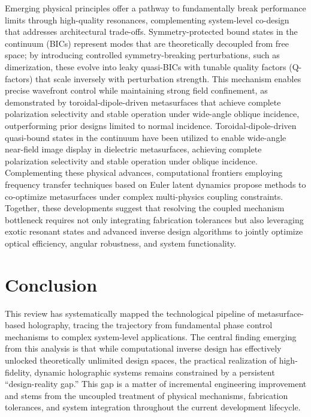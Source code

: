 Emerging physical principles offer a pathway to fundamentally break performance limits through high-quality resonances, complementing system-level co-design that addresses architectural trade-offs. Symmetry-protected bound states in the continuum (BICs) represent modes that are theoretically decoupled from free space; by introducing controlled symmetry-breaking perturbations, such as dimerization, these evolve into leaky quasi-BICs with tunable quality factors (Q-factors) that scale inversely with perturbation strength. This mechanism enables precise wavefront control while maintaining strong field confinement, as demonstrated by toroidal-dipole-driven metasurfaces that achieve complete polarization selectivity and stable operation under wide-angle oblique incidence, outperforming prior designs limited to normal incidence. Toroidal-dipole-driven quasi-bound states in the continuum have been utilized to enable wide-angle near-field image display in dielectric metasurfaces, achieving complete polarization selectivity and stable operation under oblique incidence. \citep{s2_5a46bf1115a13c8e88d03d52a56e80871e3550cd_094f009d} Complementing these physical advances, computational frontiers employing frequency transfer techniques based on Euler latent dynamics propose methods to co-optimize metasurfaces under complex multi-physics coupling constraints. Together, these developments suggest that resolving the coupled mechanism bottleneck requires not only integrating fabrication tolerances but also leveraging exotic resonant states and advanced inverse design algorithms to jointly optimize optical efficiency, angular robustness, and system functionality. \citep{doi_10_1103_physrevapplied_21_044004_d1b93ffe} \citep{s2_5a46bf1115a13c8e88d03d52a56e80871e3550cd_094f009d} \citep{doi_10_1038_s41467_025_57516_z_7c69e056}

\section{Conclusion}\label{conclusion}

This review has systematically mapped the technological pipeline of metasurface-based holography, tracing the trajectory from fundamental phase control mechanisms to complex system-level applications. The central finding emerging from this analysis is that while computational inverse design has effectively unlocked theoretically unlimited design spaces, the practical realization of high-fidelity, dynamic holographic systems remains constrained by a persistent ``design-reality gap.'' This gap is a matter of incremental engineering improvement and stems from the uncoupled treatment of physical mechanisms, fabrication tolerances, and system integration throughout the current development lifecycle.

